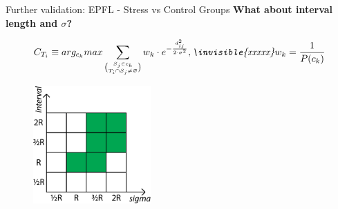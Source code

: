 \documentclass{beamer}
\begin{document}
{\begin{frame}{Further validation: EPFL - Stress vs Control Groups}
	\textbf{What about interval length and $\sigma$?}\\ 
	\begin{large}	
		\begin{equation*}
		C_{T_i} \equiv arg_{c_k}max\sum_{\binom{S_j \in c_k}{T_i\cap S_j\neq\varnothing}} w_k \cdot e^{-\frac{d_{ij}^2}{2 \cdot \sigma^2}},
		\textit{\invisible{xxxxx}}w_k = \frac{1}{P(c_k)}
		\end{equation*}	
	\end{large}
	\vspace{3mm}	
	\begin{figure}[H]
		\centering
		\includegraphics[width=0.4\textwidth]{figures/smoothing}
	\end{figure}
	\vspace{15mm}
\end{frame}

}
\end{document}
